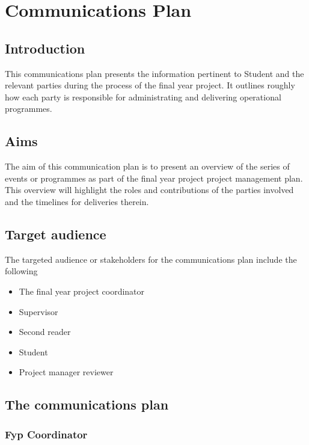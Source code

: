 \chapter{Communications Plan}

	\section{Introduction}
		This communications plan presents the information pertinent to Student and the relevant parties during the process of the final year project.
		It outlines roughly how each party is responsible for administrating and delivering operational programmes.
		\vspace{5mm}
		
	\section{Aims}
		The aim of this communication plan is to present an overview of the series of events or programmes as part of the final year project project management plan.
		This overview will highlight the roles and contributions of the parties involved and the timelines for deliveries therein. 
		\vspace{5mm}
		
	\section{Target audience}
		The targeted audience or stakeholders for the communications plan include the following
		
		\begin{itemize}
			\item The final year project coordinator
			\item Supervisor
			\item Second reader
			\item Student
			\item Project manager reviewer
		\end{itemize}
		\vspace{5mm}
		
	\section{The communications plan}

	\subsection{Fyp Coordinator}
	
